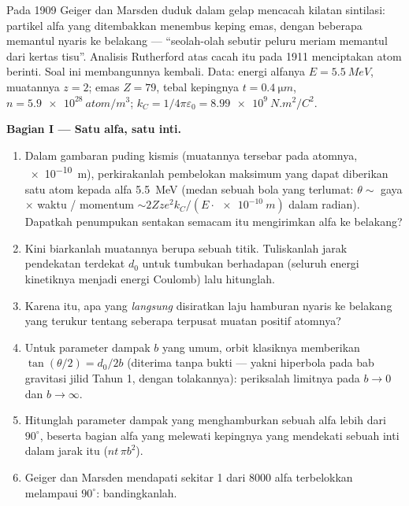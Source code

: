 \begin{problem}\label{pb:b3:scattering-theory:1}
Pada 1909 Geiger dan Marsden duduk dalam gelap mencacah kilatan
sintilasi: partikel alfa yang ditembakkan menembus keping emas, dengan
beberapa memantul nyaris ke belakang --- ``seolah-olah sebutir peluru
meriam memantul dari kertas tisu''. Analisis Rutherford atas cacah itu
pada 1911 menciptakan atom berinti. Soal ini membangunnya kembali. Data:
energi alfanya $E =
\qty{5.5}{MeV}$, muatannya $z = 2$; emas $Z = 79$, tebal kepingnya $t
= \qty{0.4}{\micro m}$, $n = \qty{5.9e28}{atom/m^3}$; $k_C =
1/4\pi\varepsilon_0 = \qty{8.99e9}{N.m^2/C^2}$.

\medskip\noindent\textbf{Bagian I --- Satu alfa, satu inti.}
\begin{enumerate}
  \item Dalam gambaran puding kismis (muatannya tersebar pada atomnya,
        \qty{e-10}{m}), perkirakanlah pembelokan maksimum yang dapat
        diberikan satu atom kepada alfa \qty{5.5}{MeV} (medan sebuah
        bola yang terlumat: $\theta \sim$ gaya $\times$ waktu / momentum
        $\sim 2Zze^2k_C/(E\cdot\qty{e-10}{m})$ dalam radian). Dapatkah
        penumpukan sentakan semacam itu mengirimkan alfa ke belakang?
  \item Kini biarkanlah muatannya berupa sebuah titik. Tuliskanlah
        jarak pendekatan terdekat $d_0$ untuk tumbukan berhadapan
        (seluruh energi kinetiknya menjadi energi Coulomb) lalu
        hitunglah.
  \item Karena itu, apa yang \emph{langsung} disiratkan laju hamburan
        nyaris ke belakang yang terukur tentang seberapa terpusat muatan
        positif atomnya?
  \item Untuk parameter dampak $b$ yang umum, orbit klasiknya
        memberikan $\tan(\theta/2) = d_0/2b$ (diterima tanpa bukti ---
        yakni hiperbola pada bab gravitasi jilid Tahun 1, dengan
        tolakannya): periksalah limitnya pada $b \to 0$ dan $b \to
        \infty$.
  \item Hitunglah parameter dampak yang menghamburkan sebuah alfa lebih
        dari $90^\circ$, beserta bagian alfa yang melewati kepingnya
        yang mendekati sebuah inti dalam jarak itu ($n t\,\pi
        b^2$).
  \item Geiger dan Marsden mendapati sekitar 1 dari 8000 alfa terbelokkan
        melampaui $90^\circ$: bandingkanlah.
\end{enumerate}


\end{problem}
